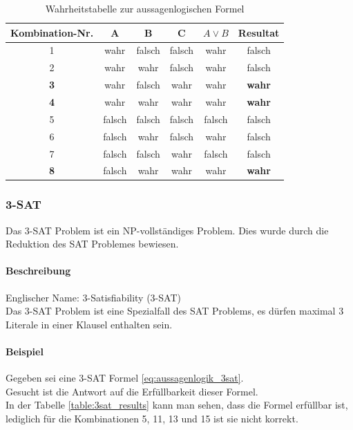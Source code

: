 \begin{table}[ht]
\centering
  \begin{tabular}{ c | c | c | c | c | c}
	\hline
	\rowcolor{gray}
	\textbf{Kombination-Nr.}	&	\textbf{A}	&	\textbf{B} 	& 	\textbf{C} 	&	$A \vee B$	&	\textbf{Resultat}\\ \hline
	1			&	wahr	& 	falsch	& 	falsch	&	wahr		&	falsch\\ \hline
	2			&	wahr	& 	wahr	& 	falsch	&	wahr		&	falsch\\ \hline
	\textbf{3}		&	wahr	& 	falsch	& 	wahr	&	wahr		&	\textbf{wahr}\\ \hline
	\textbf{4}		&	wahr	& 	wahr	& 	wahr	&	wahr		&	\textbf{wahr}\\ \hline
	5			&	falsch	& 	falsch	& 	falsch	&	falsch		&	falsch\\ \hline
	6			&	falsch	& 	wahr	& 	falsch	&	wahr		&	falsch\\ \hline
	7			&	falsch	& 	falsch	& 	wahr	&	falsch		&	falsch\\ \hline
	\textbf{8}		&	falsch	& 	wahr	& 	wahr	&	wahr		&	\textbf{wahr}\\ \hline
  \end{tabular}
   \caption{Wahrheitstabelle zur aussagenlogischen Formel}\label{table:sat_results}
\end{table}

\newpage
	\subsubsection{3-SAT}\label{3sat}
	Das 3-SAT Problem ist ein NP-vollständiges Problem. Dies wurde durch die Reduktion des SAT Problemes bewiesen.

	\paragraph{Beschreibung}
	Englischer Name: 3-Satisfiability (3-SAT)\\
	Das 3-SAT Problem ist eine Spezialfall des SAT Problems, es dürfen maximal 3 Literale in einer Klausel enthalten sein.

	\paragraph{Beispiel} Gegeben sei eine 3-SAT Formel \ref{eq:aussagenlogik_3sat}.\\
	Gesucht ist die Antwort auf die Erfüllbarkeit dieser Formel.\\
	In der Tabelle \ref{table:3sat_results} kann man sehen, dass die Formel erfüllbar ist, lediglich für die Kombinationen 5, 11, 13 und 15 ist sie nicht korrekt.

